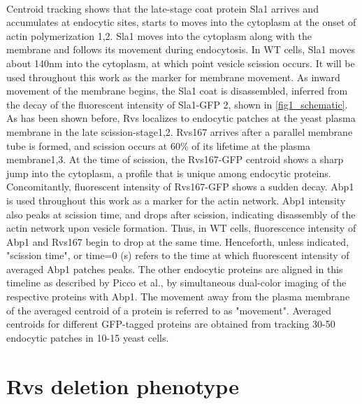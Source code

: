 \mbox{}\\
Centroid tracking shows that the late-stage coat protein Sla1 arrives and accumulates at endocytic sites, starts to moves into the cytoplasm at the onset of actin polymerization 1,2. Sla1 moves into the cytoplasm along with the membrane and follows its movement during endocytosis. In WT cells, Sla1 moves about 140nm into the cytoplasm, at which point vesicle scission occurs. It will be used throughout this work as the marker for membrane movement. As inward movement of the membrane begins, the Sla1 coat is disassembled, inferred from the decay of the fluorescent intensity of Sla1-GFP 2, shown in \ref{fig1_schematic}. As has been shown before, Rvs localizes to endocytic patches at the yeast plasma membrane in the late scission-stage1,2. Rvs167 arrives after a parallel membrane tube is formed, and scission occurs at 60\% of its lifetime at the plasma membrane1,3. At the time of scission, the Rvs167-GFP centroid shows a sharp jump into the cytoplasm, a profile that is unique among endocytic proteins. Concomitantly, fluorescent intensity of Rvs167-GFP shows a sudden decay. Abp1 is used throughout this work as a marker for the actin network. Abp1 intensity also peaks at scission time, and drops after scission, indicating disassembly of the actin network upon vesicle formation. Thus, in WT cells, fluorescence intensity of Abp1 and Rvs167 begin to drop at the same time. Henceforth, unless indicated, "scission time", or time=0 (s) refers to the time at which fluorescent intensity of averaged Abp1 patches peaks. The other endocytic proteins are aligned in this timeline as described by Picco et al., by simultaneous dual-color imaging of the respective proteins with Abp1. The movement away from the plasma membrane of the averaged centroid of a protein is referred to as "movement". Averaged centroids for different GFP-tagged proteins are obtained from tracking 30-50 endocytic patches in 10-15 yeast cells. 



\section{Rvs deletion phenotype}
\label{sec:rvsdel}

